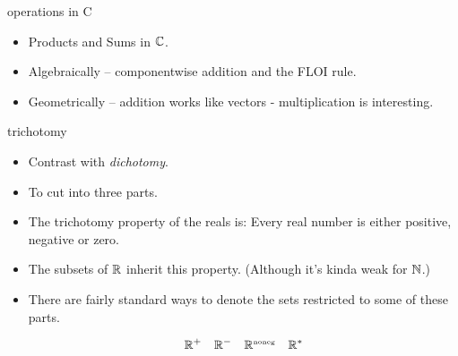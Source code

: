 \documentclass[landscape]{beamer}
\begin{document}
\begin{frame}{operations in C}
\begin{itemize}
\item Products and Sums in ${\mathbb C}$. \pause
\item Algebraically -- componentwise addition and the FLOI rule. \pause
\item Geometrically -- addition works like vectors - multiplication is \textellipsis \pause
 interesting.

\end{itemize}
\end{frame}

\begin{frame}{trichotomy}
\begin{itemize}
\item Contrast with {\em dichotomy}. \pause
\item To cut into three parts. \pause
\item The trichotomy property of the reals is:  Every real number is either positive, negative or zero. \pause
\item The subsets of ${\mathbb R}$ inherit this property. \pause (Although it's kinda weak for ${\mathbb N}$.) \pause
\item There are fairly standard ways to denote the sets restricted to some of these parts. \pause

\[  {\mathbb R}^+ \quad {\mathbb R}^- \quad {\mathbb R}^{\mbox{\tiny noneg}} \quad {\mathbb R}^\ast \]

\end{itemize}
\end{frame}
\end{document}

